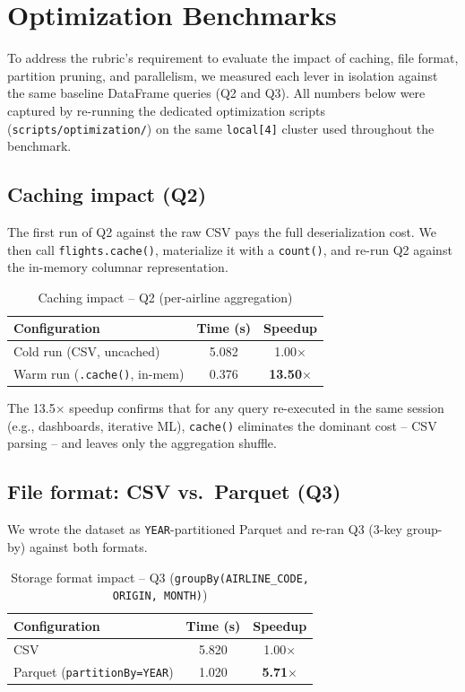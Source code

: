 \documentclass{article}
\begin{document}
\section{Optimization Benchmarks}

To address the rubric's requirement to evaluate the impact of caching, file format, partition pruning, and parallelism, we measured each lever in isolation against the same baseline DataFrame queries (Q2 and Q3). All numbers below were captured by re-running the dedicated optimization scripts (\texttt{scripts/optimization/}) on the same \texttt{local[4]} cluster used throughout the benchmark.

\subsection{Caching impact (Q2)}
The first run of Q2 against the raw CSV pays the full deserialization cost. We then call \texttt{flights.cache()}, materialize it with a \texttt{count()}, and re-run Q2 against the in-memory columnar representation.

\begin{table}[H]
\centering
\caption{Caching impact -- Q2 (per-airline aggregation)}
\begin{tabular}{@{}lcc@{}}
\toprule
\textbf{Configuration} & \textbf{Time (s)} & \textbf{Speedup} \\
\midrule
Cold run (CSV, uncached)              & 5.082 & 1.00$\times$ \\
Warm run (\texttt{.cache()}, in-mem)  & 0.376 & \textbf{13.50$\times$} \\
\bottomrule
\end{tabular}
\end{table}

The 13.5$\times$ speedup confirms that for any query re-executed in the same session (e.g., dashboards, iterative ML), \texttt{cache()} eliminates the dominant cost -- CSV parsing -- and leaves only the aggregation shuffle.

\subsection{File format: CSV vs.\ Parquet (Q3)}
We wrote the dataset as \texttt{YEAR}-partitioned Parquet and re-ran Q3 (3-key group-by) against both formats.

\begin{table}[H]
\centering
\caption{Storage format impact -- Q3 (\texttt{groupBy(AIRLINE\_CODE, ORIGIN, MONTH)})}
\begin{tabular}{@{}lcc@{}}
\toprule
\textbf{Configuration} & \textbf{Time (s)} & \textbf{Speedup} \\
\midrule
CSV     & 5.820 & 1.00$\times$ \\
Parquet (\texttt{partitionBy=YEAR}) & 1.020 & \textbf{5.71$\times$} \\
\bottomrule
\end{tabular}
\end{table}
\end{document}
